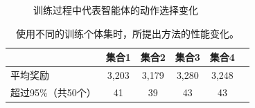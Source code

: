\begin{figure}[htbp]
  \\
  \quad\quad
  \\
  \quad\quad
  \caption{训练过程中代表智能体的动作选择变化}
  \label{agents}
\end{figure}

\begin{table}[htbp]
\centering
\caption{使用不同的训练个体集时，所提出方法的性能变化。}
\label{cluster_agents}
\renewcommand{\arraystretch}{1.2}
\setlength{\tabcolsep}{6mm}
\small

\begin{tabular}{lccccc}
\toprule
               & 集合1   & 集合2    & 集合3    & 集合4        \\ 
\midrule
平均奖励 & 3,203 & 3,179 & 3,280 & 3,248           \\
超过95\%（共50个）    & 41        & 39         & 43         & 43         \\ 
\bottomrule
\end{tabular}
\end{table}
